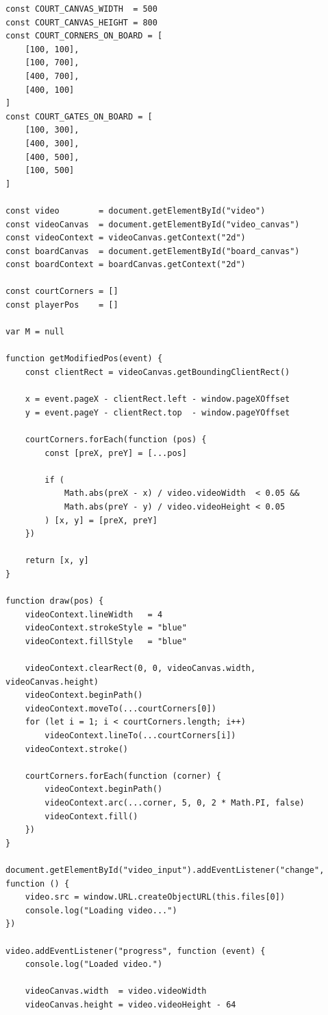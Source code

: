 \documentclass[a4j, fleqn, 12pt]{jsreport}
\begin{document}
    \begin{lstlisting}[caption=index.js, label=src:js]
const COURT_CANVAS_WIDTH  = 500
const COURT_CANVAS_HEIGHT = 800
const COURT_CORNERS_ON_BOARD = [
    [100, 100],
    [100, 700],
    [400, 700],
    [400, 100]
]
const COURT_GATES_ON_BOARD = [
    [100, 300],
    [400, 300],
    [400, 500],
    [100, 500]
]

const video        = document.getElementById("video")
const videoCanvas  = document.getElementById("video_canvas")
const videoContext = videoCanvas.getContext("2d")
const boardCanvas  = document.getElementById("board_canvas")
const boardContext = boardCanvas.getContext("2d")

const courtCorners = []
const playerPos    = []

var M = null

function getModifiedPos(event) {
    const clientRect = videoCanvas.getBoundingClientRect()

    x = event.pageX - clientRect.left - window.pageXOffset
    y = event.pageY - clientRect.top  - window.pageYOffset

    courtCorners.forEach(function (pos) {
        const [preX, preY] = [...pos]

        if (
            Math.abs(preX - x) / video.videoWidth  < 0.05 &&
            Math.abs(preY - y) / video.videoHeight < 0.05
        ) [x, y] = [preX, preY]
    })

    return [x, y]
}

function draw(pos) {
    videoContext.lineWidth   = 4
    videoContext.strokeStyle = "blue"
    videoContext.fillStyle   = "blue"

    videoContext.clearRect(0, 0, videoCanvas.width, videoCanvas.height)
    videoContext.beginPath()
    videoContext.moveTo(...courtCorners[0])
    for (let i = 1; i < courtCorners.length; i++)
        videoContext.lineTo(...courtCorners[i])
    videoContext.stroke()
    
    courtCorners.forEach(function (corner) {
        videoContext.beginPath()
        videoContext.arc(...corner, 5, 0, 2 * Math.PI, false)
        videoContext.fill()
    })
}

document.getElementById("video_input").addEventListener("change", function () {
    video.src = window.URL.createObjectURL(this.files[0])
    console.log("Loading video...")
})

video.addEventListener("progress", function (event) {
    console.log("Loaded video.")

    videoCanvas.width  = video.videoWidth
    videoCanvas.height = video.videoHeight - 64
    

\end{lstlisting}
\end{document}
